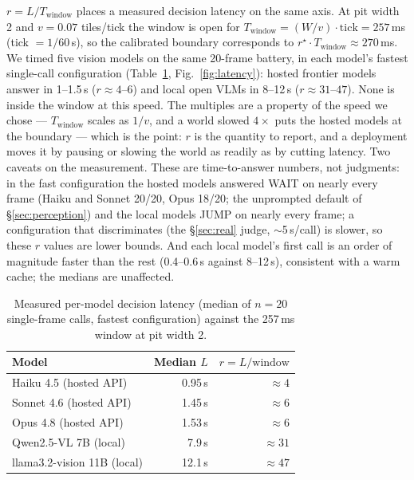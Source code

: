 \documentclass[11pt]{article}
\newcommand{\rstar}{r^{\star}}
\begin{document}
$r = L / T_{\text{window}}$ places a measured decision latency on the same
axis. At pit width 2 and $v = 0.07$ tiles/tick the window is open for
$T_{\text{window}} = (W/v)\cdot\text{tick} = 257\,$ms (tick $= 1/60\,$s), so the
calibrated boundary corresponds to $\rstar\cdot T_{\text{window}} \approx
270\,$ms. We timed five vision models on the same 20-frame battery, in each
model's fastest single-call configuration (Table~\ref{tab:latency},
Fig.~\ref{fig:latency}): hosted frontier models answer in 1--1.5\,s
($r \approx 4$--$6$) and local open VLMs in 8--12\,s ($r \approx 31$--$47$).
None is inside the window at this speed. The multiples are a property of the
speed we chose --- $T_{\text{window}}$ scales as $1/v$, and a world slowed
$4\times$ puts the hosted models at the boundary --- which is the point: $r$
is the quantity to report, and a deployment moves it by pausing or slowing the
world as readily as by cutting latency. Two caveats on the measurement. These
are time-to-answer numbers, not judgments: in the fast configuration the hosted
models answered WAIT on nearly every frame (Haiku and Sonnet 20/20, Opus
18/20; the unprompted default of \S\ref{sec:perception}) and the local models
JUMP on nearly every frame; a configuration that
discriminates (the \S\ref{sec:real} judge, $\sim$5\,s/call) is slower, so these
$r$ values are lower bounds. And each local model's first call is an order of
magnitude faster than the rest (0.4--0.6\,s against 8--12\,s), consistent with
a warm cache; the medians are unaffected.

\begin{table}[h]
  \centering
  \caption{Measured per-model decision latency (median of $n = 20$ single-frame
  calls, fastest configuration) against the 257\,ms window at pit width 2.}
  \label{tab:latency}
  \begin{tabular}{lrr}
    \toprule
    Model & Median $L$ & $r = L / \text{window}$ \\
    \midrule
    Haiku 4.5 (hosted API)        & 0.95\,s  & $\approx 4$ \\
    Sonnet 4.6 (hosted API)       & 1.45\,s  & $\approx 6$ \\
    Opus 4.8 (hosted API)         & 1.53\,s  & $\approx 6$ \\
    Qwen2.5-VL 7B (local)         & 7.9\,s   & $\approx 31$ \\
    llama3.2-vision 11B (local)   & 12.1\,s  & $\approx 47$ \\
    \bottomrule
  \end{tabular}
\end{table}
\end{document}
